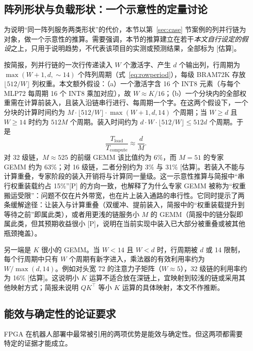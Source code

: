 \documentclass[a4paper,10.5pt]{ctexart}
\newcommand{\tP}{\textsf{[P]}}              %
\newcommand{\tE}{\textsf{[估算]}}           %
\begin{document}
\subsection{阵列形状与负载形状：一个示意性的定量讨论}\label{sec:shape}

为说明“同一阵列服务两类形状”的代价，本节以第~\ref{sec:case} 节案例的列并行链为对象，做一个示意性的推算。需要强调，本节的推算建立在若干\emph{本文自行设定的假设}之上，只用于说明趋势，不代表该项目的实测或预测结果，全部标为 \tE。

按简报，列并行链的一次行传递读入 $W$ 个激活字、产生 $d$ 个输出列，行周期为 $\max(W+1,d,\sim14)$ 个阵列周期（式~\eqref{eq:rowperiod}），每级 BRAM72K 存放 $\lfloor512/W\rfloor$ 列权重。本文额外假设：（a）一个激活字含 16 个 INT8 元素（与每个 MLP72 每周期 16 个 INT8 乘加对应），故 $W\approx K/16$；（b）一个分块内的全部权重需在计算前装入，且装入沿链串行进行、每周期一个字。在这两个假设下，一个分块的计算时间约为 $M\cdot\lfloor512/W\rfloor\cdot\max(W+1,d,14)$ 个周期；当 $W\ge d$ 且 $W\ge14$ 时约为 $512M$ 个周期。装入时间约为 $d\cdot W\cdot\lfloor512/W\rfloor\le512d$ 个周期。于是
\begin{equation}
  \frac{T_{\text{load}}}{T_{\text{compute}}} \approx \frac{d}{M}.
  \label{eq:loadratio}
\end{equation}
对 32 级链，$M\approx525$ 的前缀 GEMM 该比值约为 6\%，而 $M=51$ 的专家 GEMM 约为 63\%；对 16 级链，二者分别约为 3\% 与 31\% \tE。若装入不能与计算重叠，专家阶段的装入开销将与计算同一量级。这一示意性推算与简报中“串行权重装载约占 15\%”\tP{} 的方向一致，也解释了为什么专家 GEMM 被称为“权重搬运受限”：问题不仅在片外带宽，也在片上装入通路的串行性。它同时提示了两条缓解途径：让装入与计算重叠（双缓冲、提前装入，简报中的“权重装载提升到等待之前”即属此类），或者用更浅的链服务小 $M$ 的 GEMM（简报中的链分裂即属此类，但其预期收益很小 \tP，说明在当前实现中装入已大部分被重叠或被其他瓶颈掩盖）。

另一端是 $K$ 很小的 GEMM。当 $W<14$ 且 $W<d$ 时，行周期被 $d$ 或 14 限制，每个行周期中只有 $W$ 个周期有新字进入，乘法器的有效利用率约为 $W/\max(d,14)$。例如对头宽 72 的注意力子矩阵（$W\approx5$），32 级链的利用率约为 16\% \tE。这说明小 $K$ 运算不适合放在深链上，宜映射到较浅的链或采用其他映射方式；简报未说明 $QK^\top$ 等小 $K$ 运算的具体映射，本文不作推断。

\subsection{能效与确定性的论证要求}

FPGA 在机器人部署中最常被引用的两项优势是能效与确定性。但这两项都需要特定的证据才能成立。
\end{document}
